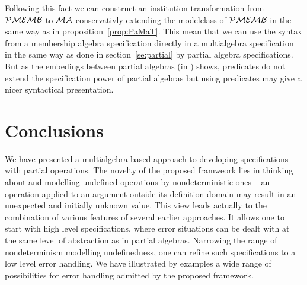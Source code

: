 \documentclass[10pt]{article}
\begin{document}
Following this fact we can construct an institution transformation from ${\mathcal{PMEMB}}$ to ${\mathcal{MA}}$ conservativly extending the modelclass of ${\mathcal{PMEMB}}$ in the same way as in proposition~\ref{prop:PaMaT}. This mean that we can use the syntax from a membership algebra specification directly in a multialgebra specification in the same way as done in section~\ref{se:partial} by partial algebra specifications. But as the embedings between partial algebras (in \cite{mossa}) shows, predicates do not extend the specification power of partial algebras but using predicates may give a nicer syntactical presentation.



\section{Conclusions}
We have presented a multialgebra based approach to developing specifications
with partial operations. The novelty of the proposed framweork lies in
thinking about and modelling undefined operations by nondeterministic ones --
an operation applied to an argument outside its definition domain may result
in an unexpected and initially unknown value. This view leads actually
to the combination of various features of several earlier approaches. It
allows one to start with high level specifications, where error
situations can be dealt with at the same level of abstraction as in partial
algebras. Narrowing the range of nondeterminism modelling undefinedness, one
can refine such specifications to a low level error handling. 
We have illustrated by examples a wide range of possibilities for error
handling admitted by the proposed framework.
\end{document}

